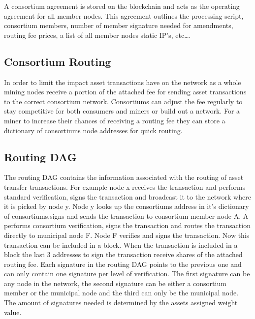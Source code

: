 \documentclass[12pt]{article}
\begin{document}
A consortium agreement is stored 
on the blockchain and acts as the operating agreement for all member nodes. 
This agreement outlines the processing script, consortium 
members, number of member signature needed for amendments, routing fee prices, a 
list of all member nodes static IP’s, etc….

\subsection{Consortium Routing}


In order to limit the impact asset transactions have on the network as a whole mining 
nodes receive a portion of the attached fee for sending asset transactions to the correct
consortium network.  Consortiums can adjust the fee regularly to stay competitive for both
consumers and miners or build out a network. 
For a miner to 
increase their chances of receiving a routing fee they can store a dictionary 
of consortiums node addresses for quick routing.



\subsection{Routing DAG}


The routing DAG contains the information associated with the routing of asset 
transfer transactions.  For example node x receives the transaction and performs standard 
verification, signs the transaction and broadcast it to the network where it is picked
by node y. Node y looks up the consortiums address in it's dictionary of 
consortiums,signs and sends the transaction to consortium member node A.  A performs 
consortium verification, signs the transaction and routes the transaction directly to 
municipal node F.  Node F verifies and signs the transaction. 
Now this transaction can be included in a block.  When the 
transaction is included in a block the last 3 addresses to sign the transaction 
receive shares of the attached routing fee.  Each signature in the routing DAG points 
to the previous one and can only contain one signature per level of verification.  
The first signature can be any node in the network, 
the second signature can be either a consortium member or the municipal node 
and the third can only be the municipal node.  The amount of signatures needed 
is determined by the assets assigned weight value. 
\end{document}
